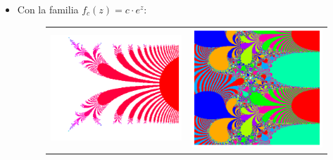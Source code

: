 \begin{itemize}
\newpage

\item Con la familia $f_c(z)=c\cdot e^z$:
  
\begin{figure}[ht]
  \centering
  \begin{tabular}{cc}
    \includegraphics[scale=0.5]{./img/C3/juliaE-1.png} &   \includegraphics[scale=0.5]{./img/C3/juliaE-2.png}
  \end{tabular}
\end{figure}

\end{itemize}